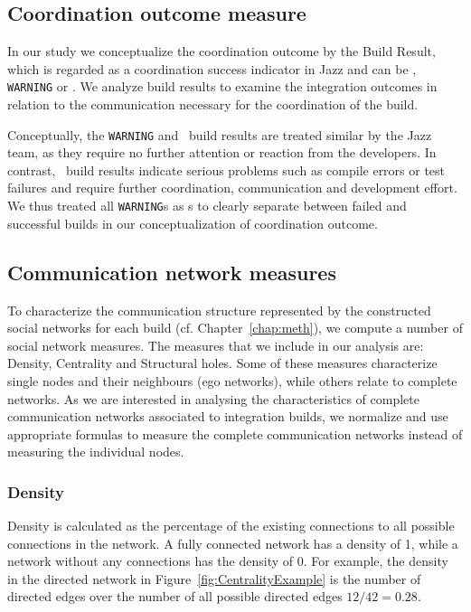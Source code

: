 \subsection{Coordination outcome measure}
In our study we conceptualize the coordination outcome by the Build Result,
which is regarded as a coordination success indicator in Jazz and can be \error,
\texttt{WARNING} or \ok. We analyze build results to examine the integration
outcomes in relation to the communication necessary for the coordination of the
build.

Conceptually, the \texttt{WARNING} and \ok\ build results are treated similar by
the Jazz team, as they require no further attention or reaction from the
developers. In contrast, \error\ build results indicate serious problems such as
compile errors or test failures and require further coordination, communication
and development effort. We thus treated all \texttt{WARNING}s as \ok s to clearly
separate between failed and successful builds in our conceptualization of
coordination outcome.


\subsection{Communication network measures}
To characterize the communication structure represented by the constructed social
networks for each build (cf. Chapter~\ref{chap:meth}), we compute a number of social network measures. The
measures that we include in our analysis are: Density, Centrality and Structural
holes. Some of these measures characterize single nodes and their neighbours (ego
networks), while others relate to complete networks. As we are interested in
analysing the characteristics of complete communication networks associated to
integration builds, we normalize and use appropriate formulas to measure the
complete communication networks instead of measuring the individual nodes.

\subsubsection{Density}
Density is calculated as the percentage of the existing connections to all
possible connections in the network. A fully connected network has a density of
1, while a network without any connections has the density of 0. For example, the
density in the directed network in Figure~\ref{fig:CentralityExample} is
the number of directed edges over the number of all possible directed edges $12/42=0.28$.


